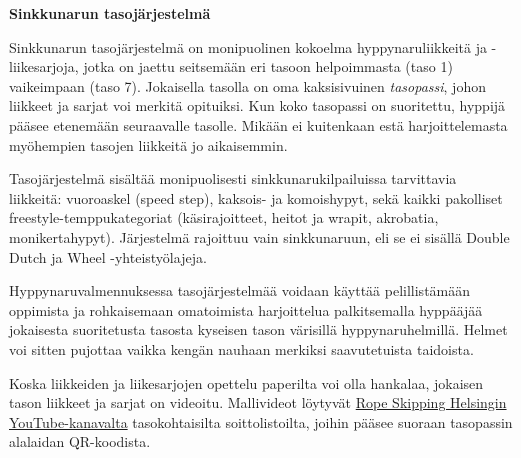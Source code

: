 \documentclass{article}
\begin{document}
\hfill%
\begin{minipage}[t]{0.75\textwidth} %
    {\Huge \bfseries Sinkkunarun tasojärjestelmä} %

	\setlength{\parindent}{0em} %
	\setlength{\parskip}{.7em} %
	\vspace*{5mm}
	Sinkkunarun tasojärjestelmä on monipuolinen kokoelma
	hyppynaruliikkeitä ja \mbox{-liikesarjoja}, jotka on jaettu seitsemään eri tasoon
	helpoimmasta (taso 1) vaikeimpaan (taso 7). Jokaisella tasolla on oma
	kaksisivuinen \emph{tasopassi}, johon liikkeet ja sarjat voi merkitä
	opituiksi. Kun koko tasopassi on suoritettu, hyppijä pääsee etenemään
	seuraavalle tasolle. Mikään ei kuitenkaan estä harjoittelemasta myöhempien
	tasojen liikkeitä jo aikaisemmin.

	Tasojärjestelmä sisältää monipuolisesti sinkkunarukilpailuissa tarvittavia
	liikkeitä: vuoroaskel (speed step), kaksois- ja komoishypyt, sekä kaikki
	pakolliset freestyle-temppukategoriat (käsirajoitteet, heitot ja wrapit,
	akrobatia, monikertahypyt). Järjestelmä rajoittuu vain sinkkunaruun, eli se
	ei sisällä Double Dutch ja Wheel \mbox{-yhteistyölajeja}.

	Hyppynaruvalmennuksessa tasojärjestelmää voidaan käyttää pelillistämään
	oppimista ja rohkaisemaan omatoimista harjoittelua palkitsemalla hyppääjää
	jokaisesta suoritetusta tasosta kyseisen tason värisillä hyppynaruhelmillä.
	Helmet voi sitten pujottaa vaikka kengän nauhaan merkiksi saavutetuista
	taidoista.

	Koska liikkeiden ja liikesarjojen opettelu paperilta voi olla hankalaa,
	jokaisen tason liikkeet ja sarjat on videoitu. Mallivideot löytyvät
	\href{https://www.youtube.com/@RopeSkippingHelsinki}{Rope Skipping Helsingin
	YouTube-kanavalta} tasokohtaisilta soittolistoilta, joihin pääsee suoraan
	tasopassin alalaidan QR-koodista.
\end{minipage}

\vspace*{-1em}
\end{document}
